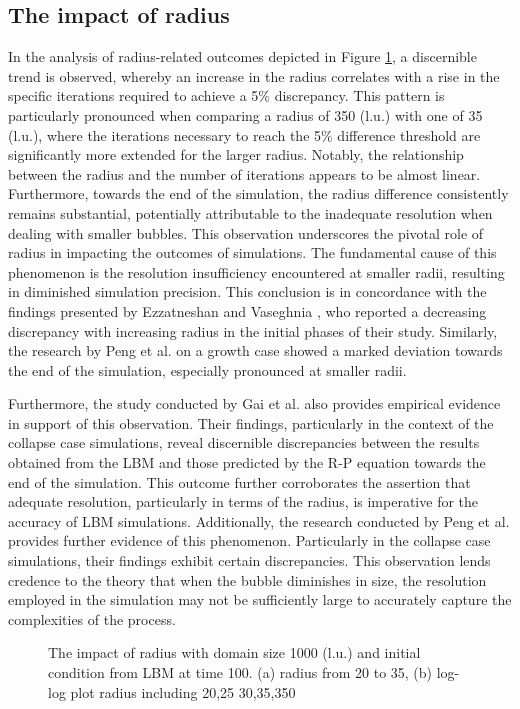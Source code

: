 \documentclass[review]{elsarticle}
\begin{document}
\subsection{The impact of radius}
In the analysis of radius-related outcomes depicted in Figure \ref{fig:radius}, a discernible trend is observed, whereby an increase in the radius correlates with a rise in the specific iterations required to achieve a 5\% discrepancy. This pattern is particularly pronounced when comparing a radius of 350 (l.u.) with one of 35 (l.u.), where the iterations necessary to reach the 5\% difference threshold are significantly more extended for the larger radius. Notably, the relationship between the radius and the number of iterations appears to be almost linear. Furthermore, towards the end of the simulation, the radius difference consistently remains substantial, potentially attributable to the inadequate resolution when dealing with smaller bubbles. This observation underscores the pivotal role of radius in impacting the outcomes of simulations. The fundamental cause of this phenomenon is the resolution insufficiency encountered at smaller radii, resulting in diminished simulation precision. This conclusion is in concordance with the findings presented by Ezzatneshan and Vaseghnia \cite{ezzatneshan2021dynamics}, who reported a decreasing discrepancy with increasing radius in the initial phases of their study. Similarly, the research by Peng et al. \cite{peng2019simulation} on a growth case showed a marked deviation towards the end of the simulation, especially pronounced at smaller radii.

Furthermore, the study conducted by Gai et al. \cite{gai2022lbm} also provides empirical evidence in support of this observation. Their findings, particularly in the context of the collapse case simulations, reveal discernible discrepancies between the results obtained from the LBM and those predicted by the R-P equation towards the end of the simulation. This outcome further corroborates the assertion that adequate resolution, particularly in terms of the radius, is imperative for the accuracy of LBM simulations. Additionally, the research conducted by Peng et al. \cite{peng2018single} provides further evidence of this phenomenon. Particularly in the collapse case simulations, their findings exhibit certain discrepancies. This observation lends credence to the theory that when the bubble diminishes in size, the resolution employed in the simulation may not be sufficiently large to accurately capture the complexities of the process. 
\setlength{\abovecaptionskip}{10pt} %
\begin{figure}[htp]
	\centering
	\setlength{}
	\setlength{}
	\caption{The impact of radius with domain size 1000 (l.u.) and initial condition from LBM at time 100. (a) radius from 20 to 35, (b) log-log plot radius including 20,25 30,35,350 }
	\label{fig:radius}
\end{figure}
\newpage
\end{document}
